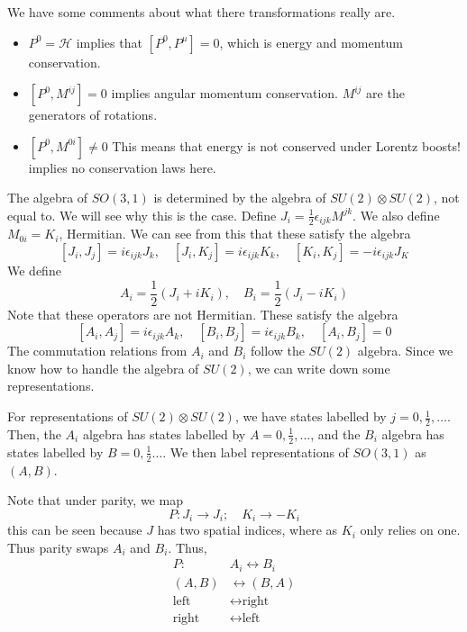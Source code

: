 \documentclass[11pt, oneside]{article}   	%
\theoremstyle{slanted}
\begin{document}
We have some comments about 
what there transformations really are. 
\begin{itemize}
\item $ P ^ 0 = \mathcal{ H }  $  implies that $ \left[  
	P ^ 0 , P ^ \mu \right]   =0   $, which 
	is energy and momentum conservation. 
\item $ \left[  P ^ 0 , M ^{ ij }  \right]   =0 $ implies 
	angular momentum conservation. 
	$ M ^{ ij } $ are the generators 
	of rotations.
\item $ \left[  P ^ 0 , M ^{ 0i }  \right] \neq  0  $ 
	This means that energy is not conserved 
	under Lorentz boosts! 
	implies no conservation laws here. 

\end{itemize}

The algebra of $ SO ( 3, 1 ) $
is determined by the 
algebra of $ SU ( 2 ) \otimes SU ( 2 )  $,
not equal to. We will see why 
this is the case. 
Define $ J _ i  = \frac{1}{2 } \epsilon _{ ij k } M ^{ jk } $. 
We also define $ M _{ 0i  } = K _ i  $, Hermitian. 
We can see from this that 
these satisfy the algebra 
\[
\left[  J _ i , J _ j  \right]   = 
i \epsilon _{ i j k  } J _ k, \quad 
\left[  J _ i , K _ j  \right]  = 
i \epsilon _{ ij k  } K _ k , \quad 
\left[  K _ i , K _ j  \right]   =  - i \epsilon _{ ij k  } J _ K 
\] We define 
\[
A_ i   = \frac{1}{2 } \left( J _ i  + i K _ i   \right) , \quad 
B _ i  = \frac{1}{2 } \left( J _ i  - i K _ i  \right) 
\] Note that these operators are not 
Hermitian. These satisfy the algebra 
\[
\left[ A_ i , A _ j  \right]  = i \epsilon _{ ij k } A _ k , 
\quad \left[  B _ i , B _ j  \right]   = i \epsilon _{ ij k }  B_ k , 
\quad \left[  A _ i , B _ j  \right]   =0 
\]  The commutation relations from $A_ i $  and $ B _ i$ 
follow the $ SU ( 2 ) $ algebra. 
Since we know how to handle the 
algebra of $ SU ( 2 )  $, 
we can write down some representations. 

For representations of $ SU ( 2 ) \otimes SU ( 2  ) $, 
we have states labelled by $ j = 0 , \frac{1}{2 } , \dots $. 
Then, the $ A _ i $ algebra has states 
labelled by $  A  = 0 , \frac{1}{2 } , \dots $, 
and the $ B _ i $ algebra has states labelled by $ B  = 0 , \frac{1}{2 } \dots  $. 
We then label representations 
of $ SO ( 3, 1 ) $ as $ \left( A, B  \right)  $. 

Note that under parity, 
we map 
\[
P : J _ i \to J _ i ; \quad K _ i \to - K _i 
\] this can be seen because $ J $ has 
two spatial indices, where as $ K _ i $ only relies on one. 
Thus parity swaps $ A _ i $ and $ B _ i $. 
Thus, 
\begin{align*}
P : & A _ i \leftrightarrow B_ i \\ 
\left( A, B  \right)  & \leftrightarrow \left( B , A  \right)  \\
\text{left} & \leftrightarrow \text{right} \\
\text{right} & \leftrightarrow \text{left} 
\end{align*}
\end{document}

